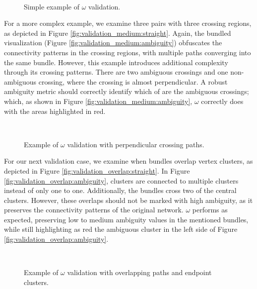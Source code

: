 \begin{figure}[ht]
\centering
{}
\\
\caption{Simple example of $\omega$ validation.}
\end{figure}

For a more complex example, we examine three pairs with three crossing regions, as depicted in Figure \ref{fig:validation_medium:straight}. Again, the bundled visualization (Figure \ref{fig:validation_medium:ambiguity}) obfuscates the connectivity patterns in the crossing regions, with multiple paths converging into the same bundle. However, this example introduces additional complexity through its crossing patterns. There are two ambiguous crossings and one non-ambiguous crossing, where the crossing is almost perpendicular. A robust ambiguity metric should correctly identify which of are the ambiguous crossings; which, as shown in Figure \ref{fig:validation_medium:ambiguity}, $\omega$ correctly does with the areas highlighted in red.

\begin{figure}[ht]
\centering
{}
\\
\caption{Example of $\omega$ validation with perpendicular crossing paths.}
\end{figure}

For our next validation case, we examine when bundles overlap vertex clusters, as depicted in Figure \ref{fig:validation_overlap:straight}. In Figure \ref{fig:validation_overlap:ambiguity}, clusters are connected to multiple clusters instead of only one to one. Additionally, the bundles cross two of the central clusters. However, these overlaps should not be marked with high ambiguity, as it preserves the connectivity patterns of the original network. $\omega$ performs as expected, preserving low to medium ambiguity values in the mentioned bundles, while still highlighting as red the ambiguous cluster in the left side of Figure \ref{fig:validation_overlap:ambiguity}.

\begin{figure}[ht]
\centering
{}
\\
\caption{Example of $\omega$ validation with overlapping paths and endpoint clusters.}
\end{figure}

